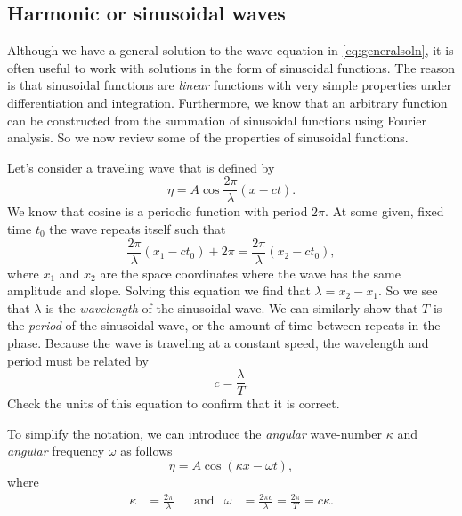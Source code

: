 \documentclass[11pt,twoside,a4paper]{article}
\begin{document}
\subsection{Harmonic or sinusoidal waves}

Although we have a general solution to the wave equation in
\autoref{eq:generalsoln}, it is often useful to work with solutions in
the form of sinusoidal functions.  The reason is that sinusoidal
functions are \textit{linear} functions with very simple properties
under differentiation and integration.  Furthermore, we know that an
arbitrary function can be constructed from the summation of sinusoidal
functions using Fourier analysis.  So we now review some of the
properties of sinusoidal functions. 

Let's consider a traveling wave that is defined by
\begin{equation}
  \label{eq:3}
  \eta = A \cos \frac{2\pi}{\lambda}(x-ct).
\end{equation}
We know that cosine is a periodic function with period $2\pi$.  At
some given, fixed time $t_0$ the wave repeats itself such that
\begin{equation}
  \label{eq:1}
  \frac{2\pi}{\lambda}(x_1-ct_0) + 2\pi = \frac{2\pi}{\lambda}(x_2-ct_0),
\end{equation}
where $x_1$ and $x_2$ are the space coordinates where the wave has the
same amplitude and slope.  Solving this equation we find that
$\lambda = x_2-x_1$. So we see that $\lambda$ is the
\textit{wavelength} of the sinusoidal wave.  We can similarly show
that $T$ is the \textit{period} of the sinusoidal wave, or the amount
of time between repeats in the phase.  Because the wave is traveling
at a constant speed, the wavelength and period must be related by
\begin{equation}
  \label{eq:clt}
  c = \frac{\lambda}{T}.
\end{equation}
Check the units of this equation to confirm that it is correct.

To simplify the notation, we can introduce the \textit{angular}
wave-number $\kappa$ and \textit{angular} frequency $\omega$ as
follows
\begin{displaymath}
  \eta = A \cos(\kappa x - \omega t),
\end{displaymath}
where
\begin{align}
  \kappa &= \frac{2\pi}{\lambda} & &\text{and} & 
                                                 \omega &= \frac{2\pi c}{\lambda} = \frac{2\pi}{T} = c\kappa.
\end{align}
\end{document}
